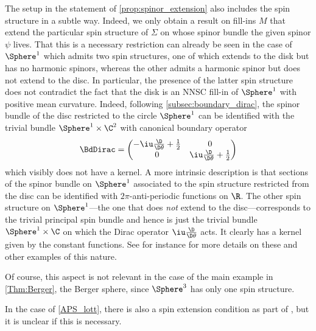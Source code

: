 \documentclass[a4paper,11pt]{amsart}
\numberwithin{equation}{section}
\begin{document}
\begin{remark}\label{remark:spin_fill-in}
    The setup in the statement of \cref{prop:spinor_extension} also includes the spin structure in a subtle way.
    Indeed, we only obtain a result on fill-ins \(M\) that extend the particular spin structure of \(\Sigma\) on whose spinor bundle the given spinor \(\psi\) lives.
    That this is a necessary restriction can already be seen in the case of \(\Sphere^1\) which admits two spin structures, one of which extends to the disk but has no harmonic spinors, whereas the other admits a harmonic spinor but does not extend to the disc.
    In particular, the presence of the latter spin structure does not contradict the fact that the disk is an NNSC fill-in of \(\Sphere^1\) with positive mean curvature.
    Indeed, following \cref{subsec:boundary_dirac}, the spinor bundle of the disc restricted to the circle \(\Sphere^1\) can be identified with the trivial bundle \(\Sphere^1 \times \C^2\) with canonical boundary operator
    \[
      \BdDirac = \begin{pmatrix}
        -\iu \frac{\D}{\D \theta} + \frac{1}{2} & 0 \\
        0 & \iu \frac{\D}{\D \theta} + \frac{1}{2}
      \end{pmatrix}  
    \]
    which visibly does not have a kernel.
    A more intrinsic description is that sections of the spinor bundle on \(\Sphere^1\) associated to the spin structure restricted from the disc can be identified with \(2\pi\)-anti-periodic functions on \(\R\).
    The other spin structure on \(\Sphere^1\)---the one that does \emph{not} extend to the disc---corresponds to the trivial principal spin bundle and hence is just the trivial bundle \(\Sphere^1 \times \C\) on which the Dirac operator \(\iu \frac{\D}{\D \theta}\) acts. It clearly has a kernel given by the constant functions.
    See for instance \cite{Baer:Dependence_spin_structure} for more details on these and other examples of this nature.
    
    Of course, this aspect is not relevant in the case of the main example in \cref{Thm:Berger}, the Berger sphere, since \(\Sphere^3\) has only one spin structure.
    
    In the case of \cref{APS_lott}, there is also a spin extension condition as part of , but it is unclear if this is necessary.
\end{remark}
\end{document}
